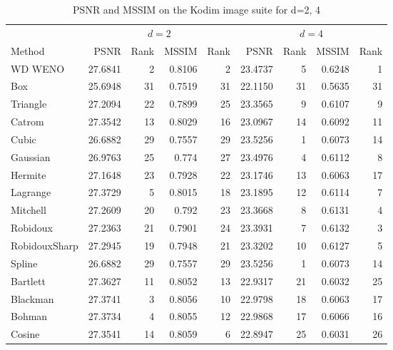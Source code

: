 	\begin{table}
		\begin{center}
			\caption{PSNR and MSSIM on the Kodim image suite for d=2, 4}
			\label{table:kodims:scale24}
			\begin{tabular}{lrrrr|rrrr}
				\hline
				& \multicolumn{4}{c}{$d=2$}& \multicolumn{4}{c}{$d=4$} \\
				Method          & PSNR      &Rank   &MSSIM      &Rank   &PSNR       &Rank   &MSSIM      &Rank  \\
				\hline
				{WD} WENO &  27.6841  &  2  &  0.8106  &  2  &  23.4737  &  5  &  0.6248  &  1 \\
				\hline
				Box &  25.6948  &  31  &  0.7519  &  31  &  22.1150  &  31  &  0.5635  &  31 \\
				Triangle &  27.2094  &  22  &  0.7899  &  25  &  23.3565  &  9  &  0.6107  &  9 \\
				\hline
				Catrom &  27.3542  &  13  &  0.8029  &  16  &  23.0967  &  14  &  0.6092  &  11 \\
				Cubic &  26.6882  &  29  &  0.7557  &  29  &  23.5256  &  1  &  0.6073  &  14 \\
				Gaussian &  26.9763  &  25  &  0.774  &  27  &  23.4976  &  4  &  0.6112  &  8 \\
				Hermite &  27.1648  &  23  &  0.7928  &  22  &  23.1746  &  13  &  0.6063  &  17 \\
				Lagrange &  27.3729  &  5  &  0.8015  &  18  &  23.1895  &  12  &  0.6114  &  7 \\
				Mitchell &  27.2609  &  20  &  0.792  &  23  &  23.3668  &  8  &  0.6131  &  4 \\
				Robidoux &  27.2363  &  21  &  0.7901  &  24  &  23.3931  &  7  &  0.6132  &  3 \\
				RobidouxSharp &  27.2945  &  19  &  0.7948  &  21  &  23.3202  &  10  &  0.6127  &  5 \\
				Spline &  26.6882  &  29  &  0.7557  &  29  &  23.5256  &  1  &  0.6073  &  14 \\
				\hline
				Bartlett &  27.3627  &  11  &  0.8052  &  13  &  22.9317  &  21  &  0.6032  &  25 \\
				Blackman &  27.3741  &  3  &  0.8056  &  10  &  22.9798  &  18  &  0.6063  &  17 \\
				Bohman &  27.3734  &  4  &  0.8055  &  12  &  22.9868  &  17  &  0.6066  &  16 \\
				\hline
				Cosine &  27.3541  &  14  &  0.8059  &  6  &  22.8947  &  25  &  0.6031  &  26 \\

\end{tabular}
\end{center}
\end{table}
